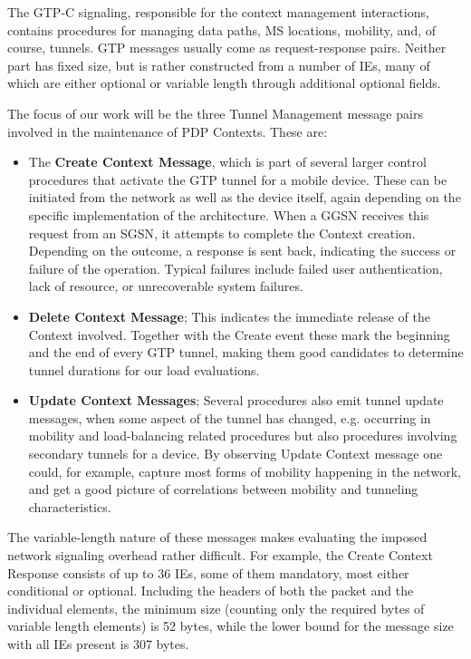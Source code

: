 The GTP-C signaling, responsible for the context management interactions, contains procedures for managing data paths, \ac{MS} locations, mobility, and, of course, tunnels. \ac{GTP} messages usually come as request-response pairs. Neither part has fixed size, but is rather constructed from a number of \acp{IE}, many of which are either optional or variable length through additional optional fields.

The focus of our work will be the three Tunnel Management message pairs involved in the maintenance of PDP Contexts. These are:

\begin{itemize}
\item The \textbf{Create Context Message}, which is part of several larger control procedures that activate the GTP tunnel for a mobile device. These can be initiated from the network as well as the device itself, again depending on the specific implementation of the architecture. When a \ac{GGSN} receives this request from an \ac{SGSN}, it attempts to complete the Context creation. Depending on the outcome, a response is sent back, indicating the success or failure of the operation. Typical failures include failed user authentication, lack of resource, or unrecoverable system failures.

\item \textbf{Delete Context Message}; This indicates the immediate release of the Context involved. 
Together with the Create event these mark the beginning and the end of every GTP tunnel, making them good candidates to determine tunnel durations for our load evaluations.

\item \textbf{Update Context Messages}; Several procedures also emit tunnel update messages, when some aspect of the tunnel has changed, e.g. occurring in mobility and load-balancing related procedures but also procedures involving secondary tunnels for a device.
By observing Update Context message one could, for example, capture most forms of mobility happening in the network, and get a good picture of correlations between mobility and tunneling characteristics. 
\end{itemize}

The variable-length nature of these messages makes evaluating the imposed network signaling overhead rather difficult. For example, the Create Context Response consists of up to 36 \acp{IE}, some of them mandatory, most either conditional or optional. Including the headers of both the packet and the individual elements, the minimum size (counting only the required bytes of variable length elements) is 52 bytes, while the lower bound for the message size with all \acp{IE} present is 307 bytes.

